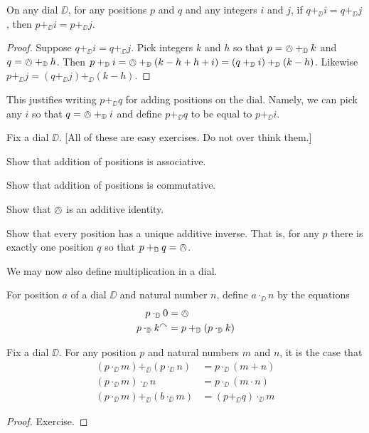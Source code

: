 \begin{lem}
	On any dial $\DD$, for any positions $p$ and $q$ and any integers $i$ and $j$, if $q +_\DD i = q +_\DD j$, then $p +_\DD i = p +_\DD j$.
\begin{proof} 
Suppose $q +_\DD i = q +_\DD j$.
Pick integers $k$ and $h$ so that $p = \owedge +_{\mathbb D} k$ and $q = \owedge +_{\mathbb D} h$. Then $p+_{\mathbb D} i = \owedge +_{\mathbb D}(k-h+h + i) = (q +_{\mathbb D} i) +_{\mathbb D} (k-h)$. Likewise $p+_\DD j = (q +_\DD j) +_\DD(k-h)$.
\end{proof}
\end{lem}

This justifies writing $p +_\DD q$ for adding positions on the dial. Namely, we can pick any $i$ so that $q = \owedge +_{\mathbb D} i$ and define $p +_\DD q$ to be equal to $p +_\DD i$. 

\begin{exer}
	Fix a dial $\DD$. [All of these are easy exercises. Do not over think them.]
	\begin{exercise}
		\item Show that addition of positions is associative.
		\item Show that addition of positions is commutative.
		\item Show that $\owedge$ is an additive identity.
		\item Show that every position has a unique additive inverse. That is, for any $p$ there is exactly one position $q$ so that $p +_{\mathbb D} q = \owedge$.
	\end{exercise}
\end{exer}

We may now also define multiplication in a dial.

\begin{defn}
	For position $a$ of a dial $\DD$ and natural number $n$, define $a\cdot_\DD n$ by the equations
	\begin{align*}
		p\cdot_{\mathbb D}  0 &= \owedge\\
		p\cdot_{\mathbb D} k^\curvearrowright &= p +_{\mathbb D} (p\cdot_{\mathbb D} k)
	\end{align*}
\end{defn}


\begin{lem}\label{lem:modular-mult}
	Fix a dial $\DD$. For any position $p$ and natural numbers $m$ and $n$, it is the case that 
	\begin{align*} 
		(p \cdot_\DD m)+_\DD (p\cdot_\DD n) &= p\cdot_\DD (m+n)\\
		(p\cdot_\DD m)\cdot_\DD n &= p\cdot_\DD (m\cdot n)\\
		(p\cdot_\DD m) +_\DD (b\cdot_\DD m) &= (p+_\DD q)\cdot_\DD m
	\end{align*}
\begin{proof}
	Exercise.
\end{proof}
\end{lem}

